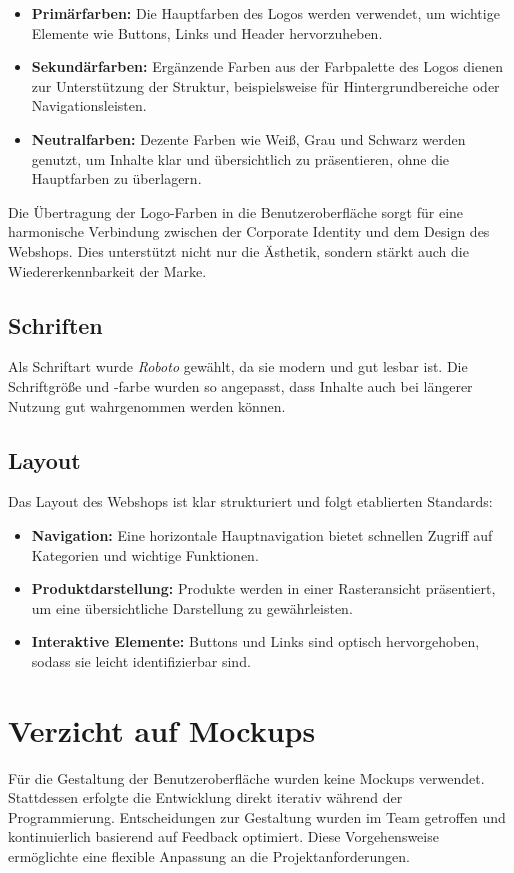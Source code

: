 \documentclass[%
	12pt,
	a4paper,
	oneside,
	parskip=full
]{scrbook}
\begin{document}
\begin{itemize}
	\item \textbf{Primärfarben:} Die Hauptfarben des Logos werden verwendet, um wichtige Elemente wie Buttons, Links und Header hervorzuheben.
	\item \textbf{Sekundärfarben:} Ergänzende Farben aus der Farbpalette des Logos dienen zur Unterstützung der Struktur, beispielsweise für Hintergrundbereiche oder Navigationsleisten.
	\item \textbf{Neutralfarben:} Dezente Farben wie Weiß, Grau und Schwarz werden genutzt, um Inhalte klar und übersichtlich zu präsentieren, ohne die Hauptfarben zu überlagern.
\end{itemize}

Die Übertragung der Logo-Farben in die Benutzeroberfläche sorgt für eine harmonische Verbindung zwischen der Corporate Identity und dem Design des Webshops. Dies unterstützt nicht nur die Ästhetik, sondern stärkt auch die Wiedererkennbarkeit der Marke.
\subsection{Schriften}
Als Schriftart wurde \textit{Roboto} gewählt, da sie modern und gut lesbar ist. Die Schriftgröße und -farbe wurden so angepasst, dass Inhalte auch bei längerer Nutzung gut wahrgenommen werden können.

\subsection{Layout}
Das Layout des Webshops ist klar strukturiert und folgt etablierten Standards:
\begin{itemize}
	\item \textbf{Navigation:} Eine horizontale Hauptnavigation bietet schnellen Zugriff auf Kategorien und wichtige Funktionen.
	\item \textbf{Produktdarstellung:} Produkte werden in einer Rasteransicht präsentiert, um eine übersichtliche Darstellung zu gewährleisten.
	\item \textbf{Interaktive Elemente:} Buttons und Links sind optisch hervorgehoben, sodass sie leicht identifizierbar sind.
\end{itemize}

\section{Verzicht auf Mockups}
Für die Gestaltung der Benutzeroberfläche wurden keine Mockups verwendet. Stattdessen erfolgte die Entwicklung direkt iterativ während der Programmierung. Entscheidungen zur Gestaltung wurden im Team getroffen und kontinuierlich basierend auf Feedback optimiert. Diese Vorgehensweise ermöglichte eine flexible Anpassung an die Projektanforderungen.
\end{document}

